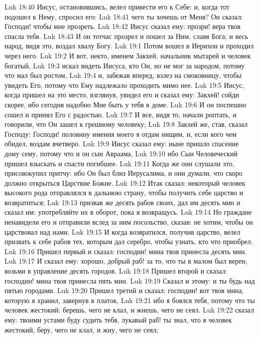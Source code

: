 \vs Luk 18:40 Иисус, остановившись, велел привести его к Себе: и, когда тот подошел к Нему, спросил его:
\vs Luk 18:41 чего ты хочешь от Меня? Он сказал: Господи! чтобы мне прозреть.
\vs Luk 18:42 Иисус сказал ему: прозри! вера твоя спасла тебя.
\vs Luk 18:43 И он тотчас прозрел и пошел за Ним, славя Бога; и весь народ, видя это, воздал хвалу Богу.
\vs Luk 19:1 Потом  вошел в Иерихон и проходил через него.
\vs Luk 19:2 И вот, некто, именем Закхей, начальник мытарей и человек богатый,
\vs Luk 19:3 искал видеть Иисуса, кто Он, но не мог за народом, потому что мал был ростом,
\vs Luk 19:4 и, забежав вперед, взлез на смоковницу, чтобы увидеть Его, потому что Ему надлежало проходить мимо нее.
\vs Luk 19:5 Иисус, когда пришел на это место, взглянув, увидел его и сказал ему: Закхей! сойди скорее, ибо сегодня надобно Мне быть у тебя в доме.
\vs Luk 19:6 И он поспешно сошел и принял Его с радостью.
\vs Luk 19:7 И все, видя то, начали роптать, и говорили, что Он зашел к грешному человеку;
\vs Luk 19:8 Закхей же, став, сказал Господу: Господи! половину имения моего я отдам нищим, и, если кого чем обидел, воздам вчетверо.
\vs Luk 19:9 Иисус сказал ему: ныне пришло спасение дому сему, потому что и он сын Авраама,
\vs Luk 19:10 ибо Сын Человеческий пришел взыскать и спасти погибшее.
\rsbpar\vs Luk 19:11 Когда же они слушали это, присовокупил притчу: ибо Он был близ Иерусалима, и они думали, что скоро должно открыться Царствие Божие.
\vs Luk 19:12 Итак сказал: некоторый человек высокого рода отправлялся в дальнюю страну, чтобы получить себе царство и возвратиться;
\vs Luk 19:13 призвав же десять рабов своих, дал им десять мин и сказал им: употребляйте их в оборот, пока я возвращусь.
\vs Luk 19:14 Но граждане ненавидели его и отправили вслед за ним посольство, сказав: не хотим, чтобы он царствовал над нами.
\vs Luk 19:15 И когда возвратился, получив царство, велел призвать к себе рабов тех, которым дал серебро, чтобы узнать, кто что приобрел.
\vs Luk 19:16 Пришел первый и сказал: господин! мина твоя принесла десять мин.
\vs Luk 19:17 И сказал ему: хорошо, добрый раб! за то, что ты в малом был верен, возьми в управление десять городов.
\vs Luk 19:18 Пришел второй и сказал: господин! мина твоя принесла пять мин.
\vs Luk 19:19 Сказал и этому: и ты будь над пятью городами.
\vs Luk 19:20 Пришел третий и сказал: господин! вот твоя мина, которую я хранил, завернув в платок,
\vs Luk 19:21 ибо я боялся тебя, потому что ты человек жестокий: берешь, чего не клал, и жнешь, чего не сеял.
\vs Luk 19:22  сказал ему: твоими устами буду судить тебя, лукавый раб! ты знал, что я человек жестокий, беру, чего не клал, и жну, чего не сеял;
